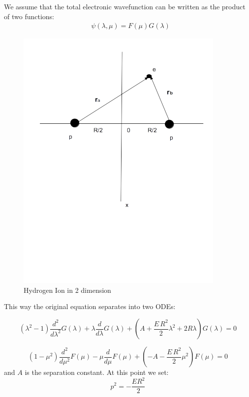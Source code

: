 We assume that the total electronic wavefunction can be written as the product of two functions:
\begin{equation}\label{variables2}
\begin{split}
& \psi(\lambda,\mu) = F(\mu)G(\lambda)
\end{split}
\end{equation}

\begin{figure}
 \captionsetup{type=figure}
  \includegraphics{H2Ion2D.png}
  \caption{Hydrogen Ion in 2 dimension} 
  \label{h2ion2d}
\end{figure}


This way the original equation separates into two ODEs:

\begin{equation}\label{L2-1}
\left(\lambda^2 - 1 \right) \frac{d^2}{ d\lambda^2 }G(\lambda) + \lambda\frac{ d}{d\lambda }G (\lambda)  + \left(A + \frac{E\,R^2}{2}\lambda^2 + 2R\lambda  \right)G (\lambda) = 0  
\end{equation}

\begin{equation}
 \left(1 - \mu^2 \right) \frac{d^2}{ d\mu^2 }F(\mu) - \mu\frac{ d }{d\mu }F(\mu) +  \left(-A -  \frac{E\,R^2}{2}\mu^2  \right)F(\mu) = 0
\end{equation}
and $ A $ is the separation constant. At this point we set:
\begin{equation}
p^2 = -\frac{ER^2}{2}
\end{equation}


